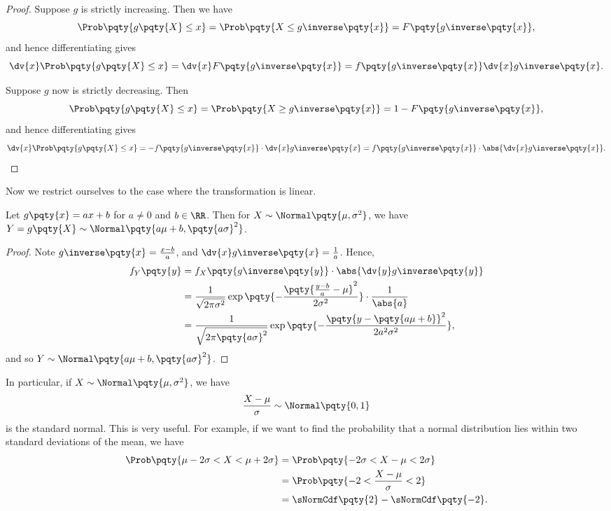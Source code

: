 \begin{proof}
    Suppose \(g\) is strictly increasing. Then we have
    \[
        \Prob\pqty{g\pqty{X} \leq x} = \Prob\pqty{X \leq g\inverse\pqty{x}} = F\pqty{g\inverse\pqty{x}},
    \]
    and hence differentiating gives
    \[
        \dv{x} \Prob\pqty{g \pqty{X} \leq x} = \dv{x} F\pqty{g\inverse\pqty{x}} = f\pqty{g\inverse\pqty{x}} \dv{x} g\inverse\pqty{x}.
    \]

    Suppose \(g\) now is strictly decreasing. Then
    \[
        \Prob\pqty{g\pqty{X} \leq x} = \Prob\pqty{X \geq g\inverse\pqty{x}} = 1 - F\pqty{g\inverse\pqty{x}},
    \]
    and hence differentiating gives
    \[
        \dv{x} \Prob\pqty{g\pqty{X} \leq x} = - f\pqty{g\inverse\pqty{x}} \cdot \dv{x} g\inverse\pqty{x} = f\pqty{g\inverse\pqty{x}} \cdot \abs{\dv{x} g\inverse\pqty{x}}.
    \]
\end{proof}

Now we restrict ourselves to the case where the transformation is linear.

\begin{proposition}
    \label{prop:lin-transformatino-normal}%
    Let \(g\pqty{x} = ax + b\) for \(a \neq 0\) and \(b \in \RR\). Then for \(X \sim \Normal\pqty{\mu, \sigma^2}\), we have \(Y = g\pqty{X} \sim \Normal\pqty{a \mu + b, \pqty{a \sigma}^2}\).
\end{proposition}

\begin{proof}
    Note \(g\inverse\pqty{x} = \frac{x - b}{a}\), and \(\dv{x} g\inverse\pqty{x} = \frac{1}{a}\). Hence,
    \begin{align*}
        f_Y\pqty{y} &= f_X\pqty{g\inverse\pqty{y}} \cdot \abs{\dv{y} g\inverse\pqty{y}} \\
        &= \frac{1}{\sqrt{2 \pi \sigma^2}} \exp\pqty{- \frac{\pqty{\frac{y - b}{a} - \mu}^2}{2 \sigma^2}} \cdot \frac{1}{\abs{a}} \\
        &= \frac{1}{\sqrt{2 \pi \pqty{a \sigma}^2}} \exp\pqty{- \frac{\pqty{y - \pqty{a\mu + b}}^2}{2 a^2 \sigma^2}},
    \end{align*}
    and so \(Y \sim \Normal\pqty{a \mu + b, \pqty{a \sigma}^2}\).
\end{proof}

In particular, if \(X \sim \Normal\pqty{\mu, \sigma^2}\), we have
\[
    \frac{X - \mu}{\sigma} \sim \Normal\pqty{0, 1}
\]
is the standard normal. This is very useful. For example, if we want to find the probability that a normal distribution lies within two standard deviations of the mean, we have
\begin{align*}
    \Prob\pqty{\mu - 2 \sigma < X < \mu + 2 \sigma} &= \Prob\pqty{-2\sigma < X - \mu < 2\sigma} \\
    &= \Prob\pqty{-2 < \frac{X - \mu}{\sigma} < 2} \\
    &= \sNormCdf\pqty{2} - \sNormCdf\pqty{-2}.
\end{align*}

